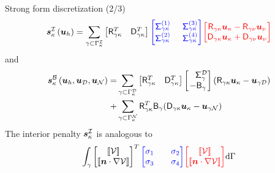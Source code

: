 \documentclass{beamer}
\begin{document}
\begin{frame}{Strong form discretization (2/3)}
    \begin{equation*}
    \bm{s}_{\kappa}^{\fnc{I}}\left(\bm{u}_{h}\right)
    = \sum_{\gamma \subset \Gamma_\kappa^\fnc{I}}
    \begin{bmatrix} \Rgk^T & \Dgk^T \end{bmatrix}
    \setlength{\arraycolsep}{7pt}
    {\color{blue}\begin{bmatrix} \Siggk{1} & \Siggk{3} \\ \Siggk{2} & \Siggk{4} \end{bmatrix}}
    {\color{red}\begin{bmatrix} \Rgk\Ukp - \Rgn\Unu \\ \Dgk\Ukp + \Dgn\Unu \end{bmatrix} }
    \end{equation*}
    and
    \begin{equation*}
    \begin{aligned}
    \bm{s}_{\kappa}^{\fnc{B}}\left(\bm{u}_{h}, \bm{u}_\fnc{D}, \bm{u}_\fnc{N}\right)
    =& \sum_{\gamma \subset \Gamma_\kappa^{\fnc{D}}}
    \begin{bmatrix} \Rgk^T & \Dgk^T \end{bmatrix}
    \begin{bmatrix} \phnt{-}\Sig_{\gamma}^{\fnc{D}} \\ -\Bg \end{bmatrix}
    (\Rgk \Ukp -\bm{u}_{\gamma {\fnc{D}}}) \\
    +& \sum_{\gamma \subset \Gamma_\kappa^{\fnc{N}}} \Rgk^{T}\B_{\gamma} (\Dgk \Ukp - \bm{u}_{\gamma {\fnc{N}}})
    \end{aligned}
    \end{equation*}
    The interior penalty $\bm{s}^{\mathcal{I}}_{\kappa}$ is analogous to
    \begin{equation*}
    \int_{\gamma} 
    \begin{bmatrix} \llbracket\mathcal{V} \rrbracket \\ \llbracket \bm{n}\cdot \nabla\mathcal{V}\rrbracket \end{bmatrix}^T
    {\color{blue}\begin{bmatrix}
    \sigma_1 && \sigma_2 \\ \sigma_3 && \sigma_4
    \end{bmatrix}}
    {\color{red}\begin{bmatrix}
     \llbracket\mathcal{V} \rrbracket \\ 
     \llbracket \bm{n}\cdot \nabla\mathcal{V}\rrbracket
    \end{bmatrix}} \mathrm{d} \Gamma
    \end{equation*}
\end{frame}
\end{document}
